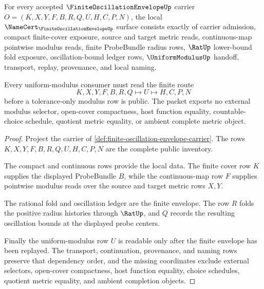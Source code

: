 \begin{theorem}
\label{thm:finite-oscillation-envelope-namecert-obligations}
For every accepted $\FiniteOscillationEnvelopeUp$ carrier $O=(K,X,Y,F,B,R,Q,U,H,C,P,N)$, the local $\NameCert_{\FiniteOscillationEnvelopeUp}$ surface consists exactly of carrier admission, compact finite-cover exposure, source and target metric reads, continuous-map pointwise modulus reads, finite ProbeBundle radius rows, $\RatUp$ lower-bound fold exposure, oscillation-bound ledger rows, $\UniformModulusUp$ handoff, transport, replay, provenance, and local naming.

Every uniform-modulus consumer must read the finite route
$$
K,X,Y,F,B,R,Q \longmapsto U \longmapsto H,C,P,N
$$
before a tolerance-only modulus row is public. The packet exports no external modulus selector, open-cover compactness, host function equality, countable-choice schedule, quotient metric equality, or ambient complete metric object.
\end{theorem}
\begin{proof}
Project the carrier of \autoref{def:finite-oscillation-envelope-carrier}. The rows $K,X,Y,F,B,R,Q,U,H,C,P,N$ are the complete public inventory.

The compact and continuous rows provide the local data. The finite cover row $K$ supplies the displayed ProbeBundle $B$, while the continuous-map row $F$ supplies pointwise modulus reads over the source and target metric rows $X,Y$.

The rational fold and oscillation ledger are the finite envelope. The row $R$ folds the positive radius histories through $\RatUp$, and $Q$ records the resulting oscillation bounds at the displayed probe centers.

Finally the uniform-modulus row $U$ is readable only after the finite envelope has been replayed. The transport, continuation, provenance, and naming rows preserve that dependency order, and the missing coordinates exclude external selectors, open-cover compactness, host function equality, choice schedules, quotient metric equality, and ambient completion objects.
\end{proof}


